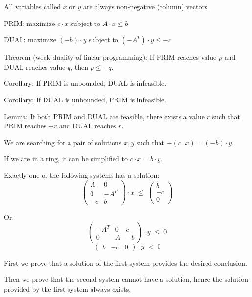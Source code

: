 \documentclass[]{article}
\begin{document}
	

All variables called $x$ or $y$ are always non-negative (column) vectors.

PRIM:
maximize $c \cdot x$ subject to $A \cdot x \le b$

DUAL:
maximize $(-b) \cdot y$ subject to $(-A^T) \cdot y \le -c$

Theorem (weak duality of linear programming):
If PRIM reaches value $p$ and DUAL reaches value $q$, then
$p \le -q$.

Corollary:
If PRIM is unbounded, DUAL is infeasible.

Corollary:
If DUAL is unbounded, PRIM is infeasible.
\bigskip

Lemma:
If both PRIM and DUAL are feasible, there exists a value $r$ such that
PRIM reaches $-r$ and DUAL reaches $r$.

We are searching for a pair of solutions $x, y$ such that
$-(c \cdot x) = (-b) \cdot y$.

If we are in a ring, it can be simplified to $c \cdot x = b \cdot y$.

Exactly one of the following systems has a solution:
$$
\begin{pmatrix}
	A & 0 \\
	0 & -A^T \\
	-c & b
\end{pmatrix}
\cdot x
\;\le\;
\begin{pmatrix}
	b \\
	-c \\
	0
\end{pmatrix}
$$

Or:
$$
\begin{pmatrix}
	-A^T & 0 & c \\
	0 & A & -b
\end{pmatrix}
\cdot y
\;\le\;
0
$$
$$
\begin{pmatrix}
	b & -c & 0
\end{pmatrix}
\cdot y
\;<\;
0
$$

First we prove that a solution of the first system provides the desired conclusion.

Then we prove that the second system cannot have a solution,
hence the solution provided by the first system always exists.
\end{document}
